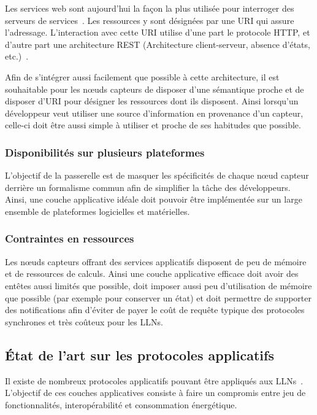 Les services web sont aujourd'hui la façon la plus utilisée pour interroger des serveurs de services~\cite{alonso2004web}.
Les ressources y sont désignées par une \ac{URI} qui assure l'adressage.
L'interaction avec cette \ac{URI} utilise d'une part le protocole \ac{HTTP}, et d'autre part une architecture \ac{REST} (Architecture client-serveur, absence d'états, etc.)~\cite{richardson2008restful}.

Afin de s'intégrer aussi facilement que possible à cette architecture, il est souhaitable pour les nœuds capteurs de disposer d'une sémantique proche et de disposer d'\ac{URI} pour désigner les ressources dont ils disposent.
Ainsi lorsqu'un développeur veut utiliser une source d'information en provenance d'un capteur, celle-ci doit être aussi simple à utiliser et proche de ses habitudes que possible.

\subsubsection{Disponibilités sur plusieurs plateformes}

L'objectif de la passerelle est de masquer les spécificités de chaque nœud capteur derrière un formalisme commun afin de simplifier la tâche des développeurs.
Ainsi, une couche applicative idéale doit pouvoir être implémentée sur un large ensemble de plateformes logicielles et matérielles.

\subsubsection{Contraintes en ressources}

Les nœuds capteurs offrant des services applicatifs disposent de peu de mémoire et de ressources de calculs.
Ainsi une couche applicative efficace doit avoir des entêtes aussi limités que possible, doit imposer aussi peu d'utilisation de mémoire que possible (par exemple pour conserver un état) et doit permettre de supporter des notifications afin d'éviter de payer le coût de requête typique des protocoles synchrones et très coûteux pour les \ac{LLN}s.

\subsection{État de l'art sur les protocoles applicatifs}

Il existe de nombreux protocoles applicatifs pouvant être appliqués aux \ac{LLN}s~\cite{karagiannis2015survey}.
L'objectif de ces couches applicatives consiste à faire un compromis entre jeu de fonctionnalités, interopérabilité et consommation énergétique.

